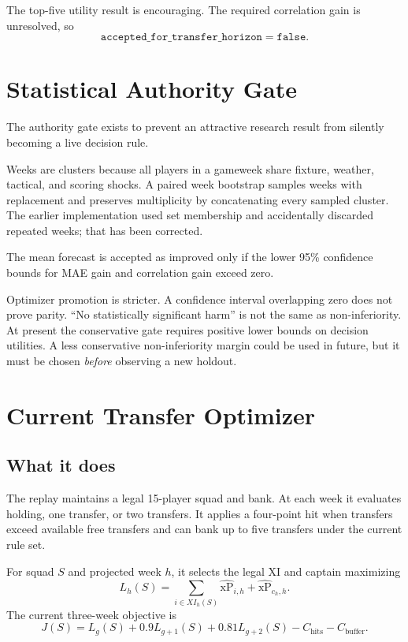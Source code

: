 \documentclass[11pt,a4paper]{article}
\newcommand{\xp}{\widehat{\mathrm{xP}}}
\begin{document}
The top-five utility result is encouraging. The required correlation gain is unresolved, so
\begin{equation}
  \texttt{accepted\_for\_transfer\_horizon}=\texttt{false}.
\end{equation}

\section{Statistical Authority Gate}

The authority gate exists to prevent an attractive research result from silently becoming a live decision rule.

Weeks are clusters because all players in a gameweek share fixture, weather, tactical, and scoring shocks. A paired week bootstrap samples weeks with replacement and preserves multiplicity by concatenating every sampled cluster. The earlier implementation used set membership and accidentally discarded repeated weeks; that has been corrected.

The mean forecast is accepted as improved only if the lower 95\% confidence bounds for MAE gain and correlation gain exceed zero.

Optimizer promotion is stricter. A confidence interval overlapping zero does not prove parity. ``No statistically significant harm'' is not the same as non-inferiority. At present the conservative gate requires positive lower bounds on decision utilities. A less conservative non-inferiority margin could be used in future, but it must be chosen \emph{before} observing a new holdout.

\section{Current Transfer Optimizer}

\subsection{What it does}

The replay maintains a legal 15-player squad and bank. At each week it evaluates holding, one transfer, or two transfers. It applies a four-point hit when transfers exceed available free transfers and can bank up to five transfers under the current rule set.

For squad $S$ and projected week $h$, it selects the legal XI and captain maximizing
\begin{equation}
  L_h(S)=\sum_{i\in XI_h(S)}\xp_{i,h}+\xp_{c_h,h}.
\end{equation}
The current three-week objective is
\begin{equation}
  J(S)=L_g(S)+0.9L_{g+1}(S)+0.81L_{g+2}(S)-C_{\text{hits}}-C_{\text{buffer}}.
\end{equation}
\end{document}
